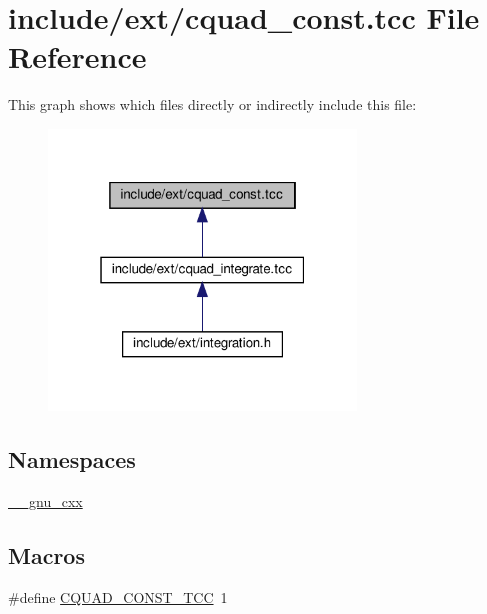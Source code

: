 \hypertarget{cquad__const_8tcc}{}\section{include/ext/cquad\+\_\+const.tcc File Reference}
\label{cquad__const_8tcc}
This graph shows which files directly or indirectly include this file\+:
\nopagebreak
\begin{figure}[H]
\begin{center}
\leavevmode
\includegraphics[width=232pt]{cquad__const_8tcc__dep__incl}
\end{center}
\end{figure}
\subsection*{Namespaces}
\begin{DoxyCompactItemize}
\item 
 \hyperlink{namespace____gnu__cxx}{\+\_\+\+\_\+gnu\+\_\+cxx}
\end{DoxyCompactItemize}
\subsection*{Macros}
\begin{DoxyCompactItemize}
\item 
\#define \hyperlink{cquad__const_8tcc_add45880010d7c8e58bc44b322ebb55c7}{C\+Q\+U\+A\+D\+\_\+\+C\+O\+N\+S\+T\+\_\+\+T\+CC}~1
\end{DoxyCompactItemize}

